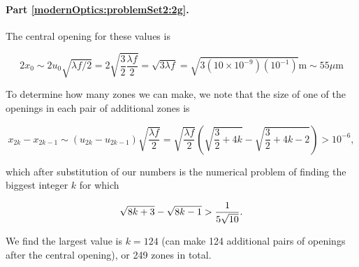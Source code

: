 {\paragraph{Part \ref{modernOptics:problemSet2:2g}.  }

The central opening for these values is

\begin{dmath}\label{eqn:modernOptics:ProblemSet2:P2:340}
2 x_0
\sim 2 u_0 \sqrt{ \lambda f/2 }
= 2 \sqrt{ \frac{3}{2} \frac{\lambda f}{2} }
= \sqrt{ 3 \lambda f }
= \sqrt{ 3 (10 \times 10^{-9})(10^{-1}) } \text{m}
\sim 55 \mu \text{m}
\end{dmath}

To determine how many zones we can make, we note that the size of one of the openings in each pair of additional zones is

\begin{dmath}\label{eqn:modernOptics:ProblemSet2:P2:360}
x_{2k} - x_{2k-1}
\sim
(u_{2k} - u_{2k-1} )
\sqrt{ \frac{\lambda f}{2} }
=
\sqrt{ \frac{\lambda f}{2} }
\left(
\sqrt{ \frac{3}{2} + 4 k }
-\sqrt{ \frac{3}{2} + 4 k - 2 }
\right) > 10^{-6},
\end{dmath}

which after substitution of our numbers is the numerical problem of finding the biggest integer $k$ for which

\begin{dmath}\label{eqn:modernOptics:ProblemSet2:P2:340b}
\sqrt{ 8 k + 3 } - \sqrt{ 8 k - 1 } > \inv{5 \sqrt{10}}.
\end{dmath}

We find the largest value is $k = 124$ (can make 124 additional pairs of openings after the central opening), or 249 zones in total.

} %
